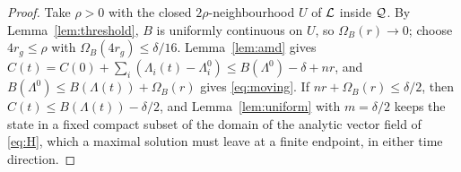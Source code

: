 \begin{proof}
Take $\rho>0$ with the closed $2\rho$-neighbourhood $U$ of $\mathcal{L}$ inside $\mathcal{Q}$. By Lemma~\ref{lem:threshold}, $B$ is uniformly continuous on $U$, so $\Omega_B(r)\to0$; choose $4r_g\le\rho$ with $\Omega_B(4r_g)\le\delta/16$. Lemma~\ref{lem:amd} gives $C(t)=C(0)+\sum_i(\Lambda_i(t)-\Lambda_i^0)\le B(\Lambda^0)-\delta+nr$, and $B(\Lambda^0)\le B(\Lambda(t))+\Omega_B(r)$ gives \eqref{eq:moving}. If $nr+\Omega_B(r)\le\delta/2$, then $C(t)\le B(\Lambda(t))-\delta/2$, and Lemma~\ref{lem:uniform} with $m=\delta/2$ keeps the state in a fixed compact subset of the domain of the analytic vector field of \eqref{eq:H}, which a maximal solution must leave at a finite endpoint, in either time direction.
\end{proof}
